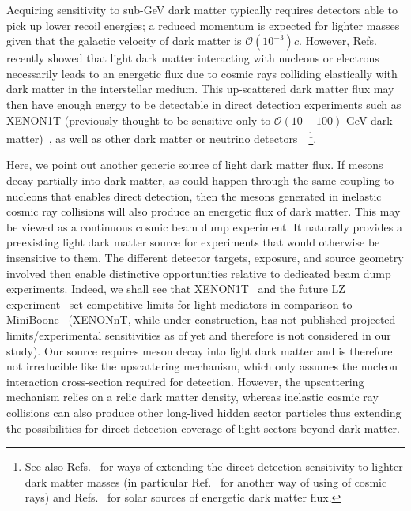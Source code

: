 \documentclass[prl,twocolumn,groupedaddress,nofootinbib, superscriptaddress]{revtex4-1}
\begin{document}
Acquiring sensitivity to sub-GeV dark matter typically requires detectors able to pick up lower recoil energies; a reduced momentum is expected for lighter masses given that the galactic velocity of dark matter is $\mathcal{O}(10^{-3}) c$. However, Refs.~\cite{Bringmann:2018cvk, Ema:2018bih} recently showed that light dark matter interacting with nucleons or electrons necessarily leads to an energetic flux due to cosmic rays colliding elastically with dark matter in the interstellar medium. This up-scattered dark matter flux may then have enough energy to be detectable in direct detection experiments such as XENON1T (previously thought to be sensitive only to $\mathcal{O}(10-100)$ GeV dark matter)~\cite{Aprile:2018dbl}, as well as other dark matter or neutrino detectors~\cite{Bringmann:2018cvk, Ema:2018bih}~\footnote{See also Refs.~\cite{Cappiello:2018hsu, Kouvaris:2016afs, Ibe:2017yqa, Dolan:2017xbu} for ways of extending the direct detection sensitivity to lighter dark matter masses (in particular Ref.~\cite{Cappiello:2018hsu} for another way of using of cosmic rays) and Refs.~\cite{Kouvaris:2015nsa, An:2017ojc, Emken:2017hnp} for solar sources of energetic dark matter flux.}. 

Here, we point out another generic source of light dark matter flux. If mesons decay partially into dark matter, as could happen through the same coupling to nucleons that enables direct detection, then the mesons generated in inelastic cosmic ray collisions will also produce an energetic flux of dark matter. This may be viewed as a continuous cosmic beam dump experiment. It naturally provides a preexisting light dark matter source for experiments that would otherwise be insensitive to them. The different detector targets, exposure, and source geometry involved then enable distinctive opportunities relative to dedicated beam dump experiments. Indeed, we shall see that XENON1T~\cite{Aprile:2018dbl} and the future LZ experiment~\cite{Akerib:2018lyp} set competitive limits for light mediators in comparison to MiniBoone~\cite{Aguilar-Arevalo:2018wea} (XENONnT, while under construction, has not published projected limits/experimental sensitivities as of yet and therefore is not considered in our study). Our source requires meson decay into light dark matter and is therefore not irreducible like the upscattering mechanism, which only assumes the nucleon interaction cross-section required for detection. However, the upscattering mechanism relies on a relic dark matter density, whereas inelastic cosmic ray collisions can also produce other long-lived hidden sector particles thus extending the possibilities for direct detection coverage of light sectors beyond dark matter.
\end{document}
